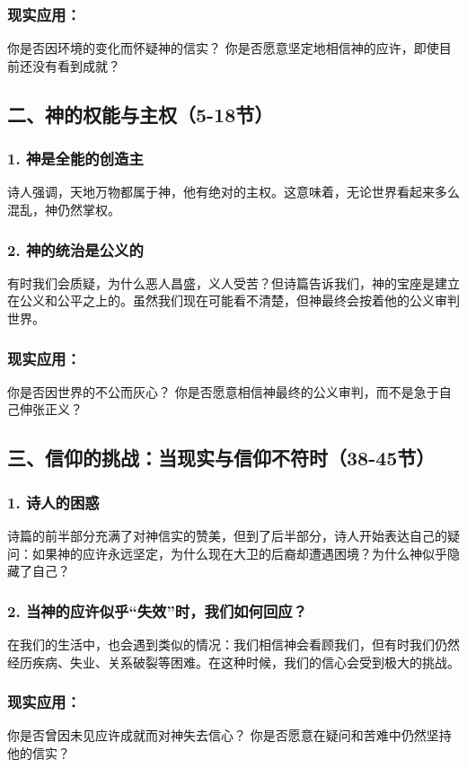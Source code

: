 \documentclass[a4paper, 12pt]{article}
\begin{document}
\subsubsection*{现实应用：}
你是否因环境的变化而怀疑神的信实？
你是否愿意坚定地相信神的应许，即使目前还没有看到成就？
\subsection*{二、神的权能与主权（5-18节）}

\subsubsection*{1. 神是全能的创造主}
诗人强调，天地万物都属于神，他有绝对的主权。这意味着，无论世界看起来多么混乱，神仍然掌权。

\subsubsection*{2. 神的统治是公义的}
有时我们会质疑，为什么恶人昌盛，义人受苦？但诗篇告诉我们，神的宝座是建立在公义和公平之上的。虽然我们现在可能看不清楚，但神最终会按着他的公义审判世界。

\subsubsection*{现实应用：}
你是否因世界的不公而灰心？
你是否愿意相信神最终的公义审判，而不是急于自己伸张正义？
\subsection*{三、信仰的挑战：当现实与信仰不符时（38-45节）}

\subsubsection*{1. 诗人的困惑}
诗篇的前半部分充满了对神信实的赞美，但到了后半部分，诗人开始表达自己的疑问：如果神的应许永远坚定，为什么现在大卫的后裔却遭遇困境？为什么神似乎隐藏了自己？

\subsubsection*{2. 当神的应许似乎“失效”时，我们如何回应？}
在我们的生活中，也会遇到类似的情况：我们相信神会看顾我们，但有时我们仍然经历疾病、失业、关系破裂等困难。在这种时候，我们的信心会受到极大的挑战。

\subsubsection*{现实应用：}
你是否曾因未见应许成就而对神失去信心？
你是否愿意在疑问和苦难中仍然坚持他的信实？
\end{document}
